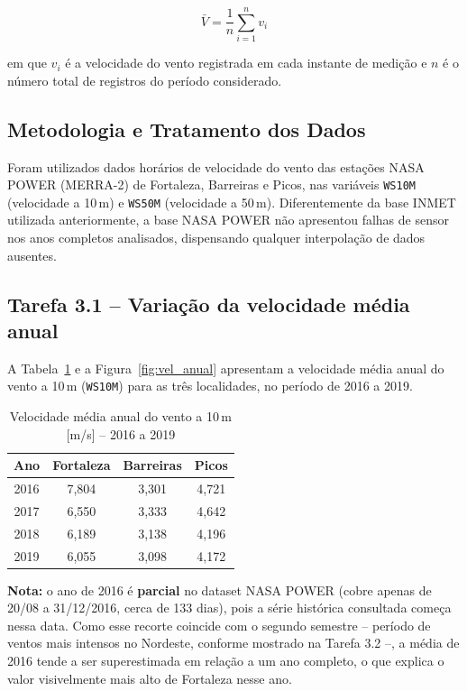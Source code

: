 \documentclass[11pt,a4paper]{article}
\begin{document}
\begin{equation}
    \bar{V} = \frac{1}{n}\sum_{i=1}^{n} v_i
    \label{eq:vmedia}
\end{equation}

em que $v_i$ é a velocidade do vento registrada em cada instante de medição
e $n$ é o número total de registros do período considerado.

\subsection{Metodologia e Tratamento dos Dados}

Foram utilizados dados horários de velocidade do vento das estações
NASA POWER (MERRA-2) de Fortaleza, Barreiras e Picos, nas variáveis
\texttt{WS10M} (velocidade a 10\,m) e \texttt{WS50M} (velocidade a 50\,m).
Diferentemente da base INMET utilizada anteriormente, a base NASA POWER não
apresentou falhas de sensor nos anos completos analisados, dispensando
qualquer interpolação de dados ausentes.

\subsection{Tarefa 3.1 -- Variação da velocidade média anual}

A Tabela~\ref{tab:vel_anual} e a Figura~\ref{fig:vel_anual} apresentam a
velocidade média anual do vento a 10\,m (\texttt{WS10M}) para as três
localidades, no período de 2016 a 2019.

\begin{table}[H]
\centering
\caption{Velocidade média anual do vento a 10\,m [m/s] -- 2016 a 2019}
\label{tab:vel_anual}
\begin{tabular}{cccc}
\toprule
\textbf{Ano} & \textbf{Fortaleza} & \textbf{Barreiras} & \textbf{Picos}\\
\midrule
2016 & 7,804 & 3,301 & 4,721\\
2017 & 6,550 & 3,333 & 4,642\\
2018 & 6,189 & 3,138 & 4,196\\
2019 & 6,055 & 3,098 & 4,172\\
\bottomrule
\end{tabular}
\end{table}

\noindent\textbf{Nota:} o ano de 2016 é \textbf{parcial} no dataset NASA
POWER (cobre apenas de 20/08 a 31/12/2016, cerca de 133 dias), pois a série
histórica consultada começa nessa data. Como esse recorte coincide com o
segundo semestre -- período de ventos mais intensos no Nordeste, conforme
mostrado na Tarefa 3.2 --, a média de 2016 tende a ser superestimada em
relação a um ano completo, o que explica o valor visivelmente mais alto de
Fortaleza nesse ano.
\end{document}
